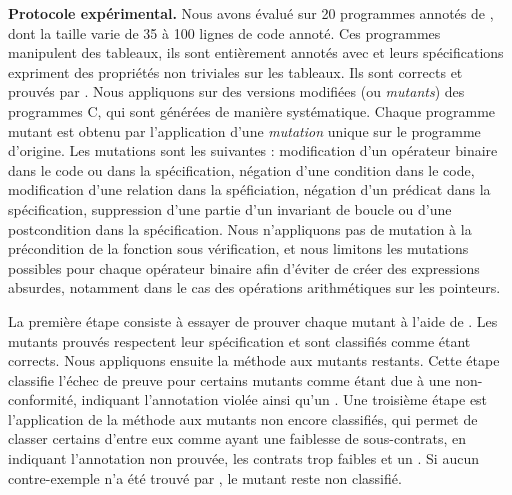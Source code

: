 \textbf{Protocole expérimental.}
Nous avons évalué \stady sur 20 programmes annotés de \cite{ACSLbyExample},
dont la taille varie de 35 à 100 lignes de code annoté.
Ces programmes manipulent des tableaux, ils sont entièrement annotés avec \eacsl
et leurs spécifications expriment des propriétés non triviales sur les tableaux.
Ils sont corrects et prouvés par \Wp.
Nous appliquons \stady sur des versions modifiées (ou {\em mutants}) des
programmes C, qui sont générées de manière systématique.
Chaque programme mutant est obtenu par l'application d'une {\em mutation} unique
sur le programme d'origine.
Les mutations sont les suivantes : modification d'un opérateur binaire dans le
code ou dans la spécification, négation d'une condition dans le code,
modification d'une relation dans la spéficiation, négation d'un prédicat dans la
spécification, suppression d'une partie d'un invariant de boucle ou d'une
postcondition dans la spécification.
Nous n'appliquons pas de mutation à la précondition de la fonction sous
vérification, et nous limitons les mutations possibles pour chaque opérateur
binaire afin d'éviter de créer des expressions absurdes, notamment dans le
cas des opérations arithmétiques sur les pointeurs.

La première étape consiste à essayer de prouver chaque mutant à l'aide de \Wp.
Les mutants prouvés respectent leur spécification et sont classifiés comme étant
corrects.
Nous appliquons ensuite la méthode \NCD aux mutants restants.
Cette étape classifie l'échec de preuve pour certains mutants comme étant due à
une non-conformité, indiquant l'annotation violée ainsi qu'un \NCCE.
Une troisième étape est l'application de la méthode \SWD aux mutants non
encore classifiés, qui permet de classer certains d'entre eux comme ayant
une faiblesse de sous-contrats, en indiquant l'annotation non prouvée, les
contrats trop faibles et un \SWCE.
Si aucun contre-exemple n'a été trouvé par \SWD, le mutant reste non classifié.


